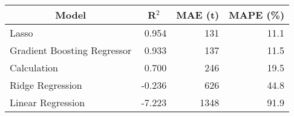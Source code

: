 
\begin{tabular}[t]{lrrr}
\toprule
\multicolumn{1}{c}{Model} & \multicolumn{1}{c}{R$^2$} & \multicolumn{1}{c}{MAE (t)} & \multicolumn{1}{c}{MAPE (\%)}\\
\midrule
Lasso & 0.954 & 131 & 11.1\\
Gradient Boosting Regressor & 0.933 & 137 & 11.5\\
Calculation & 0.700 & 246 & 19.5\\
Ridge Regression & -0.236 & 626 & 44.8\\
Linear Regression & -7.223 & 1348 & 91.9\\
\bottomrule
\end{tabular}
